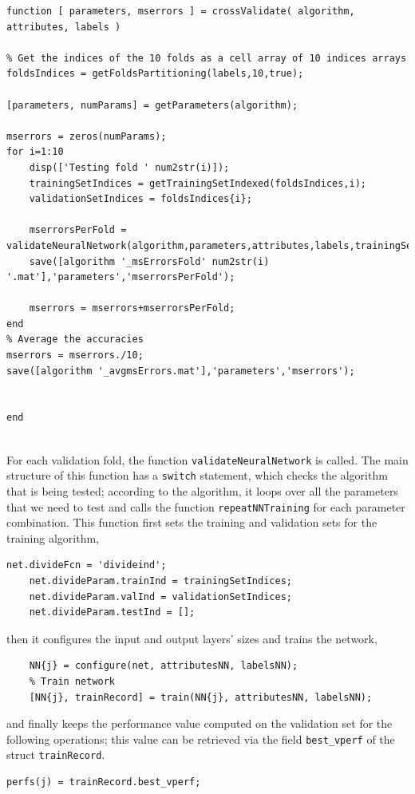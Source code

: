\documentclass{article}
\begin{document}
\begin{lstlisting}[breaklines=true]
function [ parameters, mserrors ] = crossValidate( algorithm, attributes, labels )

% Get the indices of the 10 folds as a cell array of 10 indices arrays
foldsIndices = getFoldsPartitioning(labels,10,true);

[parameters, numParams] = getParameters(algorithm);

mserrors = zeros(numParams);
for i=1:10
    disp(['Testing fold ' num2str(i)]);
    trainingSetIndices = getTrainingSetIndexed(foldsIndices,i);
    validationSetIndices = foldsIndices{i};
    
    mserrorsPerFold = validateNeuralNetwork(algorithm,parameters,attributes,labels,trainingSetIndices,validationSetIndices);
    save([algorithm '_msErrorsFold' num2str(i) '.mat'],'parameters','mserrorsPerFold');
    
    mserrors = mserrors+mserrorsPerFold;
end
% Average the accuracies
mserrors = mserrors./10;
save([algorithm '_avgmsErrors.mat'],'parameters','mserrors');


end


\end{lstlisting}
For each validation fold, the function \verb$validateNeuralNetwork$ is called. The main structure of this function has a \verb$switch$ statement, which checks the algorithm that is being tested; according to the algorithm, it loops over all the parameters that we need to test and calls the function \verb$repeatNNTraining$ for each parameter combination. This function first sets the training and validation sets for the training algorithm,
\begin{lstlisting}[firstnumber=17]
    net.divideFcn = 'divideind';
    net.divideParam.trainInd = trainingSetIndices;
    net.divideParam.valInd = validationSetIndices;
    net.divideParam.testInd = [];
\end{lstlisting}
then it configures the input and output layers' sizes and trains the network,
\begin{lstlisting}[firstnumber=22]
    % Set up input and output layer
    NN{j} = configure(net, attributesNN, labelsNN);
    % Train network
    [NN{j}, trainRecord] = train(NN{j}, attributesNN, labelsNN);
\end{lstlisting}
and finally keeps the performance value computed on the validation set for the following operations; this value can be retrieved via the field \verb$best_vperf$ of the struct \verb$trainRecord$.
\begin{lstlisting}[firstnumber=30]
    perfs(j) = trainRecord.best_vperf;
\end{lstlisting}
\end{document}

